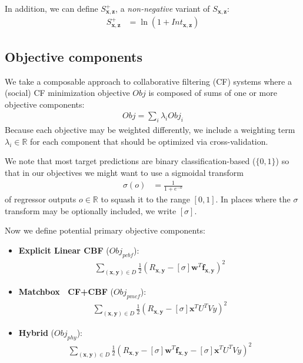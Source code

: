 \documentclass[11pt,a4paper]{article}
\newcommand{\R}{\mathbb{R}}
\newcommand{\Obj}{\mathit{Obj}}
\newcommand{\pcbf}{\mathit{pcbf}}
\newcommand{\pmcf}{\mathit{pmcf}}
\newcommand{\phy}{\mathit{phy}}
\newcommand{\x}{\vec{x}}
\newcommand{\y}{\vec{y}}
\newcommand{\z}{\vec{z}}
\newcommand{\w}{\vec{w}}
\newcommand{\f}{\vec{f}}
\renewcommand{\vec}[1]{\mathbf{#1}}
\begin{document}
In addition, we can define $S^+_{\x,\z}$, a \emph{non-negative} 
variant of $S_{\x,\z}$:
\begin{align}
S^+_{\x,\z} & = \ln \left( 1 + \mathit{Int}_{\x,\z} \right)
\end{align}

\subsection{Objective components}

\label{sec:obj_comp}

We take a composable approach to collaborative filtering (CF) systems
where a (social) CF minimization 
objective $\mathit{Obj}$ is composed of sums of one or more
objective components:
\begin{align}
\mathit{Obj} = \sum_i \lambda_i \mathit{Obj}_i
\end{align}
Because each objective may be weighted differently, we include a 
weighting term $\lambda_i \in \R$ for each component that should be
optimized via cross-validation.

We note that most target predictions are binary 
classification-based ($\{0,1\}$)
so that in our objectives we might want to use a sigmoidal transform 
\begin{align}
\sigma(o) & = \frac{1}{1 + e^{-o}}
\end{align}
of regressor outputs $o \in \R$ to squash it 
to the range $[0, 1]$.  
In places where the $\sigma$ transform may be optionally included, 
we write $[\sigma]$.  

Now we define potential primary objective components:
\begin{itemize}
\item {\bf Explicit Linear CBF} ($\Obj_\pcbf$):
\begin{align}
\sum_{(\x,\y) \in D} \frac{1}{2} (R_{\x,\y} - [\sigma] \w^T \f_{\x,\y})^2
\end{align}
\item {\bf Matchbox~\cite{matchbox} CF+CBF} ($\Obj_\pmcf$):
\begin{align}
\sum_{(\x,\y) \in D} \frac{1}{2} (R_{\x,\y} - [\sigma] \x^T U^T V y)^2
\end{align}
\item {\bf Hybrid} ($\Obj_\phy$):
\begin{align}
\sum_{(\x,\y) \in D} \frac{1}{2} (R_{\x,\y} - [\sigma] \w^T \f_{\x,\y} - [\sigma] \x^T U^T V y)^2
\end{align}
\end{itemize}
\end{document}
